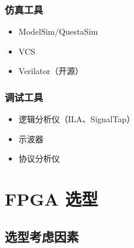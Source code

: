 \subsubsection{仿真工具}

\begin{itemize}
  \item ModelSim/QuestaSim
  \item VCS
  \item Verilator（开源）
\end{itemize}

\subsubsection{调试工具}

\begin{itemize}
  \item 逻辑分析仪（ILA、SignalTap）
  \item 示波器
  \item 协议分析仪
\end{itemize}

\section{FPGA 选型}

\subsection{选型考虑因素}

